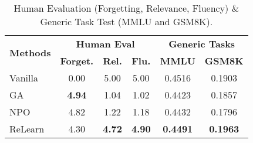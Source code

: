 \begin{table}[htbp]
  \centering
    \renewcommand{\arraystretch}{1.2}
    \setlength{\tabcolsep}{4pt}
  \footnotesize
  \begin{tabular}{l|ccc|cc}
    \hline
    \multirow{2}{*}{\textbf{Methods}} & \multicolumn{3}{c|}{\textbf{Human Eval}} & \multicolumn{2}{c}{\textbf{Generic Tasks}} \\
    \cline{2-6}
     & \textbf{Forget.} & \textbf{Rel.} & \textbf{Flu.} & \textbf{MMLU} & \textbf{GSM8K} \\
    \hline
    Vanilla & 0.00 & 5.00 & 5.00 & 0.4516 & 0.1903 \\
    GA & \textbf{4.94} & 1.04 & 1.02 & 0.4423 & 0.1857 \\
    NPO & 4.82 & 1.22 & 1.18 & 0.4432 & 0.1796 \\
    ReLearn & 4.30 & \textbf{4.72} & \textbf{4.90} & \textbf{0.4491} & \textbf{0.1963} \\
    \hline
  \end{tabular}
  \caption{Human Evaluation (Forgetting, Relevance, Fluency) \& Generic Task Test (MMLU and GSM8K).}
  \label{tab:combined_results}
\end{table}
